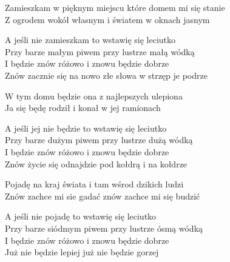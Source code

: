 \begin{text}
    Zamieszkam w pięknym miejscu które domem mi się stanie\\
    Z ogrodem wokół własnym i światem w oknach jasnym

    A jeśli nie zamieszkam to wstawię się leciutko\\
    Przy barze małym piwem przy lustrze małą wódką\\
    I będzie znów różowo i znowu będzie dobrze\\
    Znów zacznie się na nowo złe słowa w strzęp je podrze

    W tym domu będzie ona z najlepszych ulepiona\\
    Ja się będę rodził i konał w jej ramionach

    A jeśli jej nie będzie to wstawię się leciutko\\
    Przy barze dużym piwem przy lustrze dużą wódką\\
    I będzie znów różowo i znowu będzie dobrze\\
    Znów życie się odnajdzie pod kołdrą i na kołdrze

    Pojadę na kraj świata i tam wśrod dzikich ludzi\\
    Znów zachce mi sie gadać znów zachce mi się budzić

    A jeśli nie pojadę to wstawię się leciutko\\
    Przy barze siódmym piwem przy lustrze ósmą wódką\\
    I będzie znów różowo i znowu będzie dobrze\\
    Już nie będzie lepiej już nie będzie gorzej
\end{text}
\begin{chord}

\end{chord}